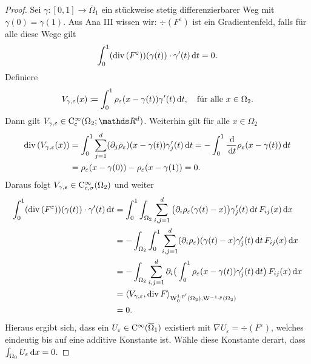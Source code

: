 \begin{proof}
  Sei $\gamma \colon [0,1] \to \overline\Omega_1$ ein stückweise stetig differenzierbarer Weg mit $\gamma(0) = \gamma(1)$.
  Aus Ana III wissen wir: $\div(F^\varepsilon)$ ist ein Gradientenfeld, falls für alle diese Wege gilt
  $$
  \int_0^1 (\mathrm{div\,} (F^\varepsilon))(\gamma(t))\cdot \gamma'(t) \, {\operatorname{d}\!{t}} = 0.
  $$
  Definiere 
  $$
  V_{\gamma,\varepsilon}(x) \coloneqq \int_0^1 \rho_\varepsilon(x - \gamma(t))\gamma'(t) \, {\operatorname{d}\!{t}}, \quad\text{für alle } x \in \Omega_2.
  $$
  Dann gilt $V_{\gamma,\varepsilon} \in \CC_{\cc}^\infty(\Omega_2; \R^d)$.
  Weiterhin gilt für alle $x \in \Omega_2$
  \begin{align*}
    \mathrm{div\,} (V_{\gamma,\varepsilon}(x))
    &= \int_0^1 \sum_{j = 1}^d (\partial_j \rho_\varepsilon)(x - \gamma(t)) \gamma_j'(t) \, {\operatorname{d}\!{t}}
    = - \int_0^1 \frac{\, {\operatorname{d}\!{}} }{\, {\operatorname{d}\!{t}}} \rho_\varepsilon(x - \gamma(t)) \, {\operatorname{d}\!{t}} \\
    &= \rho_\varepsilon(x - \gamma(0)) - \rho_\varepsilon(x - \gamma(1))
    = 0.
  \end{align*}
  Daraus folgt $V_{\gamma,\varepsilon} \in \mathrm{C}_{\mathrm{c}, \sigma}^\infty(\Omega_2)$ und weiter
  \begin{align*}
    \int_0^1(\mathrm{div\,} (F^\varepsilon))(\gamma(t)) \cdot \gamma'(t) \, {\operatorname{d}\!{t}}
    &= \int_0^1 \int_{\Omega_2} \sum_{i,j = 1}^d \big(\partial_i \rho_\varepsilon(\gamma(t) - x)\big) \gamma_j'(t) \, {\operatorname{d}\!{t}} \, F_{ij}(x)  \, {\operatorname{d}\!{x}} \\
    &= -\int_{\Omega_2} \int_0^1 \sum_{i,j = 1}^d (\partial_i \rho_\varepsilon) (\gamma(t) - x) \gamma_j'(t) \, {\operatorname{d}\!{t}} \, F_{ij}(x) \, {\operatorname{d}\!{x}} \\
    &= -\int_{\Omega_2} \sum_{i,j=1}^d \partial_i\big(  \int_0^1 \rho_\varepsilon(x - \gamma(t)) \gamma_j'(t) \, {\operatorname{d}\!{t}} \big) \, F_{ij}(x) \, {\operatorname{d}\!{x}} \\
    &= \langle V_{\gamma,\varepsilon}, \mathrm{div\,} F \rangle_{\mathrm{W}_0^{1,p'}(\Omega_2), \mathrm{W}^{-1,p}(\Omega_2)} \\
    &= 0.
  \end{align*}
  Hieraus ergibt sich, dass ein $U_\varepsilon \in \mathrm{C}^\infty(\overline\Omega_1)$ existiert mit $\nabla U_\varepsilon = \div(F^\varepsilon)$, welches eindeutig bis auf eine additive Konstante ist.
  Wähle diese Konstante derart, dass $\int_{\Omega_0} U_\varepsilon \, {\operatorname{d}\!{x}} = 0$.


\end{proof}
